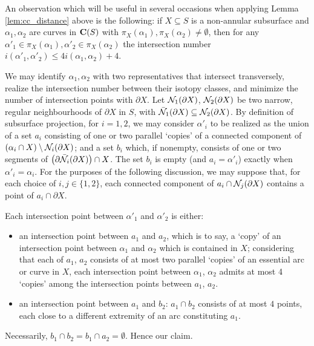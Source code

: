 \begin{rmk}\label{rmk:subsurf_inters_bound}
An observation which will be useful in several occasions when applying Lemma \ref{lem:cc_distance} above is the following: if $X\subseteq S$ is a non-annular subsurface and $\alpha_1,\alpha_2$ are curves in $\mathbf C(S)$ with $\pi_X(\alpha_1),\pi_X(\alpha_2)\not=\emptyset$, then for any $\alpha'_1\in\pi_X(\alpha_1),\alpha'_2\in\pi_X(\alpha_2)$ the intersection number $i(\alpha'_1,\alpha'_2)\leq 4 i(\alpha_1,\alpha_2)+4$.

We may identify $\alpha_1,\alpha_2$ with two representatives that intersect transversely, realize the intersection number between their isotopy classes, and minimize the number of intersection points with $\partial X$. Let ${\mathcal N}_1(\partial X)$, ${\mathcal N}_2(\partial X)$ be two narrow, regular neighbourhoods of $\partial X$ in $S$, with $\bar{{\mathcal N}}_1(\partial X) \subseteq {\mathcal N}_2(\partial X)$. By definition of subsurface projection, for $i=1,2$, we may consider $\alpha'_i$ to be realized as the union of a set $a_i$ consisting of one or two parallel `copies' of a connected component of $(\alpha_i\cap X)\setminus{\mathcal N}_i(\partial X)$; and a set $b_i$ which, if nonempty, consists of one or two segments of $\left(\partial\bar {{\mathcal N}}_i(\partial X)\right)\cap X$. The set $b_i$ is empty (and $a_i=\alpha'_i$) exactly when $\alpha'_i=\alpha_i$. For the purposes of the following discussion, we may suppose that, for each choice of $i,j\in\{1,2\}$, each connected component of $a_i\cap {\mathcal N}_j(\partial X)$ contains a point of $a_i\cap\partial X$.

Each intersection point between $\alpha'_1$ and $\alpha'_2$ is either:
\begin{itemize}
\item an intersection point between $a_1$ and $a_2$, which is to say, a `copy' of an intersection point between $\alpha_1$ and $\alpha_2$ which is contained in $X$; considering that each of $a_1$, $a_2$ consists of at most two parallel `copies' of an essential arc or curve in $X$, each intersection point between $\alpha_1$, $\alpha_2$ admits at most 4 `copies' among the intersection points between $a_1$, $a_2$.
\item an intersection point between $a_1$ and $b_2$: $a_1\cap b_2$ consists of at most $4$ points, each close to a different extremity of an arc constituting $a_1$.
\end{itemize}

Necessarily, $b_1\cap b_2=b_1\cap a_2=\emptyset$. Hence our claim.
\end{rmk}

